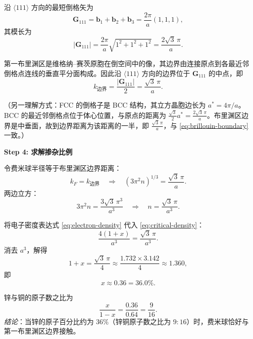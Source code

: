 \begin{derivationbox}[标准解题过程]
沿 $\langle 111\rangle$ 方向的最短倒格矢为
\begin{equation}
\bm{G}_{111} = \bm{b}_1 + \bm{b}_2 + \bm{b}_3
            = \frac{2\pi}{a}(1,1,1),
\end{equation}
其模长为
\begin{equation}
|\bm{G}_{111}| = \frac{2\pi}{a}\sqrt{1^2+1^2+1^2} = \frac{2\sqrt{3}\,\pi}{a}.
\end{equation}

第一布里渊区是维格纳--赛茨原胞在倒空间中的像，其边界由连接原点到各最近邻倒格点连线的垂直平分面构成。因此沿 $\langle 111\rangle$ 方向的边界位于 $\bm{G}_{111}$ 的中点，即
\begin{equation}
k_{\mathrm{边界}} = \frac{|\bm{G}_{111}|}{2} = \frac{\sqrt{3}\,\pi}{a}.
\label{eq:brillouin-boundary}
\end{equation}

（另一理解方式：FCC 的倒格子是 BCC 结构，其立方晶胞边长为 $a^*=4\pi/a$。BCC 的最近邻倒格点位于体心位置，与原点的距离为 $\frac{\sqrt{3}}{2}a^* = \frac{2\sqrt{3}\,\pi}{a}$。布里渊区边界是中垂面，故到边界距离为该距离的一半，即 $\frac{\sqrt{3}\,\pi}{a}$，与 \eqref{eq:brillouin-boundary} 一致。）

\textbf{Step 4: 求解掺杂比例}

令费米球半径等于布里渊区边界距离：
\begin{equation}
k_F = k_{\mathrm{边界}}
\quad\Longrightarrow\quad
(3\pi^{2}n)^{1/3} = \frac{\sqrt{3}\,\pi}{a}.
\end{equation}
两边立方：
\begin{equation}
3\pi^{2}n = \frac{3\sqrt{3}\,\pi^{3}}{a^{3}}
\quad\Longrightarrow\quad
n = \frac{\sqrt{3}\,\pi}{a^{3}}.
\label{eq:critical-density}
\end{equation}

将电子密度表达式 \eqref{eq:electron-density} 代入 \eqref{eq:critical-density}：
\begin{equation}
\frac{4(1+x)}{a^{3}} = \frac{\sqrt{3}\,\pi}{a^{3}}.
\end{equation}
消去 $a^{3}$，解得
\begin{equation}
1+x = \frac{\sqrt{3}\,\pi}{4}
\approx \frac{1.732\times 3.142}{4}
\approx 1.360,
\end{equation}
即
\begin{equation}
\boxed{x \approx 0.36 = 36.0\%.}
\end{equation}

锌与铜的原子数之比为
\begin{equation}
\frac{x}{1-x} = \frac{0.36}{0.64} = \frac{9}{16}.
\end{equation}
\textit{结论}：当锌的原子百分比约为 $36\%$（锌铜原子数之比为 $9:16$）时，费米球恰好与第一布里渊区边界接触。
\end{derivationbox}

